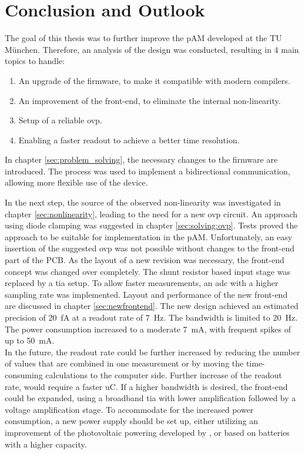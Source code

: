 
\chapter{Conclusion and Outlook}
\label{sec:conclusion}
The goal of this thesis was to further improve the \ac{pAM} developed at the TU München. Therefore, an analysis of the design was conducted, resulting in 4 main topics to handle:
\begin{enumerate}
	\item An upgrade of the firmware, to make it compatible with modern compilers.
	\item An improvement of the front-end, to eliminate the internal non-linearity.
	\item Setup of a reliable \ac{ovp}.
	\item Enabling a faster readout to achieve a better time resolution.
\end{enumerate}
In chapter \ref{sec:problem_solving}, the necessary changes to the firmware are introduced. The process was used to implement a bidirectional communication, allowing more flexible use of the device.
 
In the next step, the source of the observed non-linearity was investigated in chapter \ref{sec:nonlinearity}, leading to the need for a new \ac{ovp} circuit. An approach using diode clamping was suggested in chapter \ref{sec:solving:ovp}. Tests proved the approach to be suitable for implementation in the \ac{pAM}. Unfortunately, an easy insertion of the suggested \ac{ovp} was not possible without changes to the front-end part of the PCB.
As the layout of a new revision was necessary, the front-end concept was changed over completely. The shunt resistor based input stage was replaced by a \ac{tia} setup. To allow faster measurements, an \ac{adc} with a higher sampling rate was implemented. Layout and performance of the new front-end are discussed in chapter \ref{sec:newfrontend}. The new design achieved an estimated precision of \SI{20}{\femto\ampere} at a readout rate of \SI{7}{\hertz}. The bandwidth is limited to \SI{20}{\hertz}. The power consumption increased to a moderate \SI{7}{\milli\ampere}, with frequent spikes of up to \SI{50}{\milli\ampere}. \\

In the future, the readout rate could be further increased by reducing the number of values that are combined in one measurement or by moving the time-consuming calculations to the computer side. Further increase of the readout rate, would require a faster \ac{uC}.
If a higher bandwidth is desired, the front-end could be expanded, using a broadband \ac{tia} with lower amplification followed by a voltage amplification stage.
To accommodate for the increased power consumption, a new power supply should be set up, either utilizing an improvement of the photovoltaic powering developed by \cite{rudolph}, or based on batteries with a higher capacity. \\

